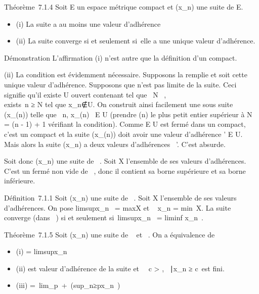\documentclass[]{article}
\begin{document}
Théorème~7.1.4 Soit E un espace métrique compact et (x_n) une
suite de E.

\begin{itemize}
\itemsep1pt\parskip0pt
\item
  (i) La suite a au moins une valeur d'adhérence
\item
  (ii) La suite converge si et seulement si~elle a une unique valeur
  d'adhérence.
\end{itemize}

Démonstration L'affirmation (i) n'est autre que la définition d'un
compact.

(ii) La condition est évidemment nécessaire. Supposons la remplie et
soit \ell cette unique valeur d'adhérence. Supposons que \ell n'est pas limite
de la suite. Ceci signifie qu'il existe U ouvert contenant \ell tel que
\forall~N \in {}~, \\exists~n ≥ N tel
que x_n∉U. On construit ainsi
facilement une sous suite (x_\phi(n)) telle que
\forall~n, x_\phi(n)~ \in E \diagdown U (prendre \phi(n) le
plus petit entier supérieur à N = \phi(n - 1) + 1 vérifiant la condition).
Comme E \diagdown U est fermé dans un compact, c'est un compact et la suite
(x_\phi(n)) doit avoir une valeur d'adhérence \ell' \in E \diagdown U. Mais
alors la suite (x_n) a deux valeurs d'adhérences
\ell\neq~\ell'. C'est absurde.

Soit donc (x_n) une suite de \overline{}~.
Soit X l'ensemble de ses valeurs d'adhérences. C'est un fermé non vide
de \overline{}~, donc il contient sa borne supérieure
et sa borne inférieure.

Définition~7.1.1 Soit (x_n) une suite de
\overline{}~. Soit X l'ensemble de ses valeurs
d'adhérences. On pose limsupx_n~
= maxX et \liminf~
x_n = min~X. La suite converge (dans
\overline{}~) si et seulement
si~limsupx_n~
= liminf x_n~.

Théorème~7.1.5 Soit (x_n) une suite de
\overline{}~ et \ell \in\overline{}~. On a
équivalence de

\begin{itemize}
\itemsep1pt\parskip0pt
\item
  (i) \ell = limsupx_n~
\item
  (ii) \ell est valeur d'adhérence de la suite et
  \forall~~c > \ell, \n \in
  ~∣x_n ≥ c\ est
  fini.
\item
  (iii) \ell =\
  lim_p\rightarrow~+\infty~(sup_n≥px_n~)
\end{itemize}
\end{document}
